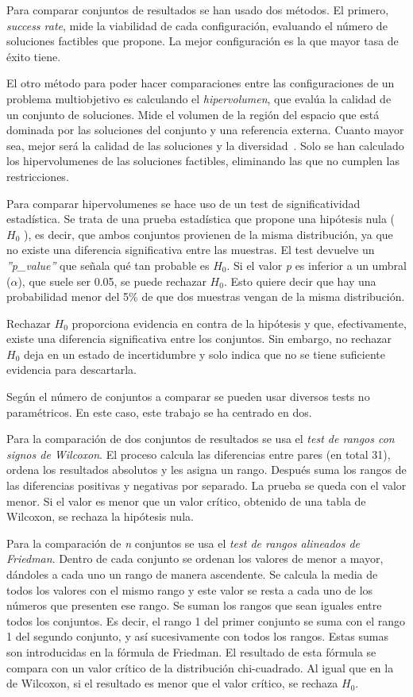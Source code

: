 Para comparar conjuntos de resultados se han usado dos métodos. El primero, \textit{success rate}, mide la viabilidad de cada configuración, evaluando el número de soluciones factibles que propone. La mejor configuración es la que mayor tasa de éxito tiene.

El otro método para poder hacer comparaciones entre las configuraciones de un problema multiobjetivo es calculando el \textit{hipervolumen}, que evalúa la calidad de un conjunto de soluciones. Mide el volumen de la región del espacio que está dominada por las soluciones del conjunto y una referencia externa. Cuanto mayor sea, mejor será la calidad de las soluciones y la diversidad~\cite{pymoo2024hypervolume}. Solo se han calculado los hipervolumenes de las soluciones factibles, eliminando las que no cumplen las restricciones.

Para comparar hipervolumenes se hace uso de un test de significatividad estadística. Se trata de una prueba estadística que propone una hipótesis nula (\(H_0\) ), es decir, que ambos conjuntos provienen de la misma distribución, ya que no existe una diferencia significativa entre las muestras. El test devuelve un \textit{''p\_value''} que señala qué tan probable es \(H_0\). Si el valor \textit{p} es inferior a un umbral ($\alpha$), que suele ser 0.05, se puede rechazar \(H_0\). Esto quiere decir que hay una probabilidad menor del 5\% de que dos muestras vengan de la misma distribución.

Rechazar \(H_0\) proporciona evidencia en contra de la hipótesis y que, efectivamente, existe una diferencia significativa entre los conjuntos. Sin embargo, no rechazar \(H_0\) deja en un estado de incertidumbre y solo indica que no se tiene suficiente evidencia para descartarla.

Según el número de conjuntos a comparar se pueden usar diversos tests no paramétricos. En este caso, este trabajo se ha centrado en dos.

Para la comparación de dos conjuntos de resultados se usa el \textit{test de rangos con signos de Wilcoxon}. El proceso calcula las diferencias entre pares (en total 31), ordena los resultados absolutos y les asigna un rango. Después suma los rangos de las diferencias positivas y negativas por separado. La prueba se queda con el valor menor. Si el valor es menor que un valor crítico, obtenido de una tabla de Wilcoxon, se rechaza la hipótesis nula.~\cite{scipy2024wilcoxon}

Para la comparación de \textit{n} conjuntos se usa el \textit{test de rangos alineados de Friedman}. Dentro de cada conjunto se ordenan los valores de menor a mayor, dándoles a cada uno un rango de manera ascendente. Se calcula la media de todos los valores con el mismo rango y este valor se resta a cada uno de los números que presenten ese rango. Se suman los rangos que sean iguales entre todos los conjuntos. Es decir, el rango 1 del primer conjunto se suma con el rango 1 del segundo conjunto, y así sucesivamente con todos los rangos. Estas sumas son introducidas en la fórmula de Friedman. El resultado de esta fórmula se compara con un valor crítico de la distribución chi-cuadrado. Al igual que en la de Wilcoxon, si el resultado es menor que el valor crítico, se rechaza \(H_0\).~\cite{stac2024friedman}

